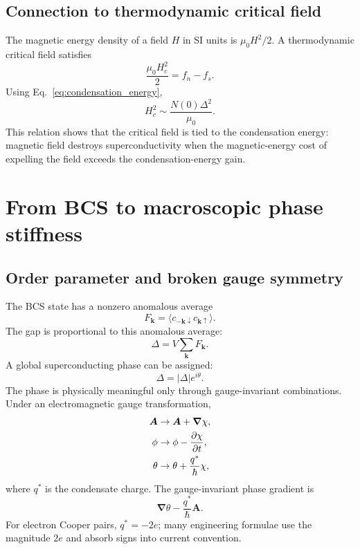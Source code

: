 \documentclass[11pt]{article}
\numberwithin{equation}{section}
\newcommand{\kvec}{\bm{k}}
\newcommand{\Avec}{\bm{A}}
\renewcommand{\grad}{\bm{\nabla}}
\newcommand{\Nzero}{N(0)}
\begin{document}
\subsection{Connection to thermodynamic critical field}

The magnetic energy density of a field $H$ in SI units is $\mu_0 H^2/2$. A thermodynamic critical field satisfies
\begin{equation}
\frac{\mu_0 H_c^2}{2}=f_n-f_s.
\end{equation}
Using Eq.~\eqref{eq:condensation_energy},
\begin{equation}
H_c^2\sim \frac{\Nzero\Delta^2}{\mu_0}.
\end{equation}
This relation shows that the critical field is tied to the condensation energy: magnetic field destroys superconductivity when the magnetic-energy cost of expelling the field exceeds the condensation-energy gain.

\section{From BCS to macroscopic phase stiffness}

\subsection{Order parameter and broken gauge symmetry}

The BCS state has a nonzero anomalous average
\begin{equation}
F_{\kvec}=\langle c_{-\kvec\downarrow}c_{\kvec\uparrow}\rangle.
\end{equation}
The gap is proportional to this anomalous average:
\begin{equation}
\Delta=V\sum_{\kvec} F_{\kvec}.
\end{equation}
A global superconducting phase can be assigned:
\begin{equation}
\Delta=|\Delta|e^{i\theta}.
\end{equation}
The phase is physically meaningful only through gauge-invariant combinations. Under an electromagnetic gauge transformation,
\begin{align}
\Avec &\to \Avec+\grad\chi,\\
\phi &\to \phi-\pdv{\chi}{t},\\
\theta &\to \theta+\frac{q^*}{\hbar}\chi,
\end{align}
where $q^*$ is the condensate charge. The gauge-invariant phase gradient is
\begin{equation}
\grad\theta-\frac{q^*}{\hbar}\Avec.
\end{equation}
For electron Cooper pairs, $q^*=-2e$; many engineering formulae use the magnitude $2e$ and absorb signs into current convention.
\end{document}
